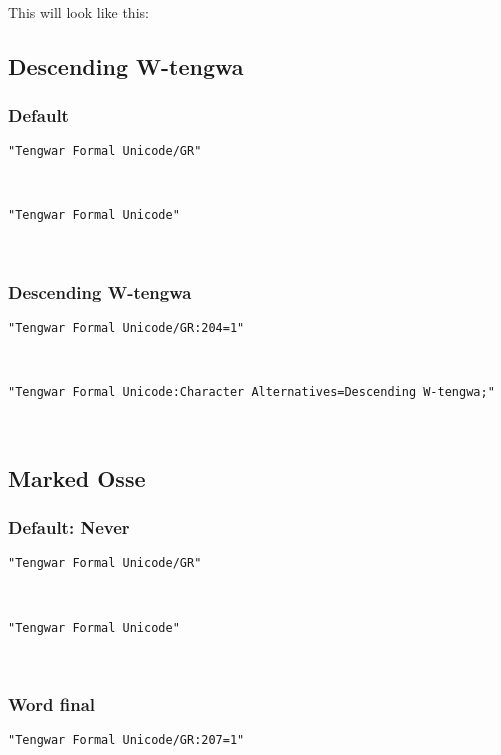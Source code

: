 \documentclass[11pt,a4paper]{article}
\begin{document}
\paragraph{} This will look like this: \myformal   \normalfont


\subsection{Descending W-tengwa}

\subsubsection{Default}

\noindent \texttt{"Tengwar Formal Unicode/GR"}

\formalGR  

\noindent \texttt{"Tengwar Formal Unicode"}

\formalAAT  

\subsubsection{Descending W-tengwa}

\texttt{"Tengwar Formal Unicode/GR:204=1"}

\formalGRdescw  

\noindent \texttt{"Tengwar Formal Unicode:Character Alternatives=Descending W-tengwa;"}

\formalAATdescw  


\subsection{Marked Osse}

\subsubsection{Default: Never}

\texttt{"Tengwar Formal Unicode/GR"}

\formalGR 

\noindent \texttt{"Tengwar Formal Unicode"}

\formalAAT 

\subsubsection{Word final}

\texttt{"Tengwar Formal Unicode/GR:207=1"}
\end{document}
